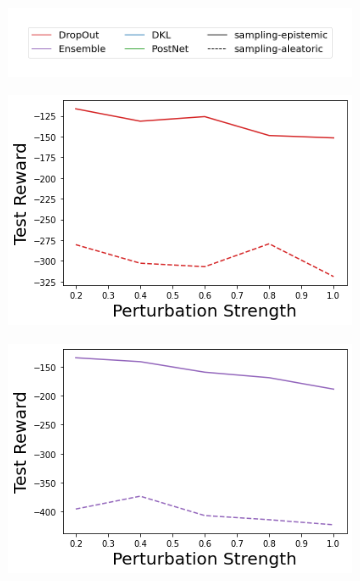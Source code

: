 \begin{figure}
    \centering
        \vspace{-3mm}
    \begin{subfigure}{.45\textwidth}
        \includegraphics[width=\textwidth]{sections/011_icml2022/resources/sampling-legend.png}
    \end{subfigure}
    \vspace{-3mm}
    
    \begin{subfigure}{.245\textwidth}
        \includegraphics[width=\textwidth]{sections/011_icml2022/resources/transition_shift-DropOut-AcrobotShift-v0-mean_reward_.png}
    \end{subfigure}
    \begin{subfigure}{.245\textwidth}
        \includegraphics[width=\textwidth]{sections/011_icml2022/resources/transition_shift-Ensemble-AcrobotShift-v0-mean_reward_.png}

\end{subfigure}
\end{figure}
